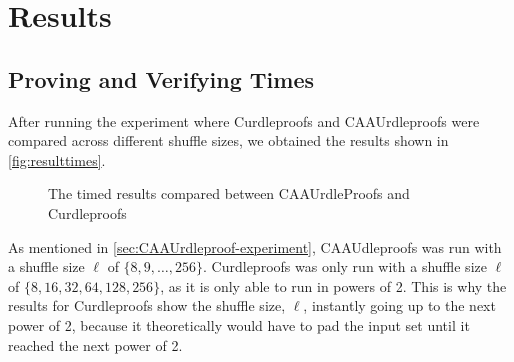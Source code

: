 \section{Results}\label{sec:results}
\subsection{Proving and Verifying Times}\label{subsec:results:provingverifying}

After running the experiment where Curdleproofs and CAAUrdleproofs were compared across different shuffle sizes, we obtained the results shown in \autoref{fig:resulttimes}.

\begin{figure}[!htb]
    \centering
    \qquad
    \caption{The timed results compared between CAAUrdleProofs and Curdleproofs}%
    \label{fig:resulttimes}%
\end{figure}

As mentioned in \autoref{sec:CAAUrdleproof-experiment}, CAAUdleproofs was run with a shuffle size $\ell$ of $\{8,9,\dots,256\}$.
Curdleproofs was only run with a shuffle size $\ell$ of $\{8,16,32,64,128,256\}$, as it is only able to run in powers of 2.
This is why the results for Curdleproofs show the shuffle size, $\ell$, instantly going up to the next power of 2, because it theoretically would have to pad the input set until it reached the next power of 2.

